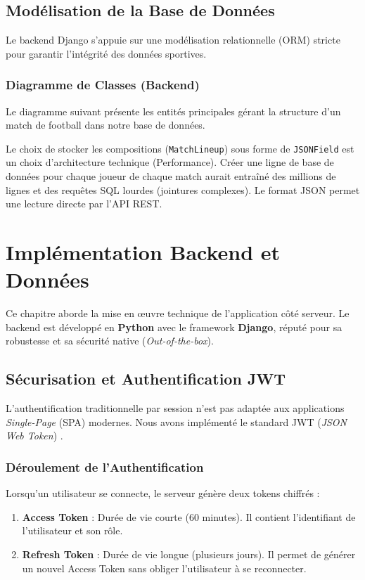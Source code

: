 \documentclass[12pt,a4paper,oneside]{book}
\begin{document}
\section{Modélisation de la Base de Données}
Le backend Django s'appuie sur une modélisation relationnelle (ORM) stricte pour garantir l'intégrité des données sportives.

\subsection{Diagramme de Classes (Backend)}
Le diagramme suivant présente les entités principales gérant la structure d'un match de football dans notre base de données.



Le choix de stocker les compositions (\texttt{MatchLineup}) sous forme de \texttt{JSONField} est un choix d'architecture technique (Performance). Créer une ligne de base de données pour chaque joueur de chaque match aurait entraîné des millions de lignes et des requêtes SQL lourdes (jointures complexes). Le format JSON permet une lecture directe par l'API REST.

\chapter{Implémentation Backend et Données}

Ce chapitre aborde la mise en œuvre technique de l'application côté serveur. Le backend est développé en \textbf{Python} avec le framework \textbf{Django}, réputé pour sa robustesse et sa sécurité native (\textit{Out-of-the-box}).

\section{Sécurisation et Authentification JWT}
L'authentification traditionnelle par session n'est pas adaptée aux applications \textit{Single-Page} (SPA) modernes. Nous avons implémenté le standard JWT (\textit{JSON Web Token}) \cite{jones2015jwt}.

\subsection{Déroulement de l'Authentification}
Lorsqu'un utilisateur se connecte, le serveur génère deux tokens chiffrés :
\begin{enumerate}
    \item \textbf{Access Token} : Durée de vie courte (60 minutes). Il contient l'identifiant de l'utilisateur et son rôle.
    \item \textbf{Refresh Token} : Durée de vie longue (plusieurs jours). Il permet de générer un nouvel Access Token sans obliger l'utilisateur à se reconnecter.
\end{enumerate}
\end{document}
